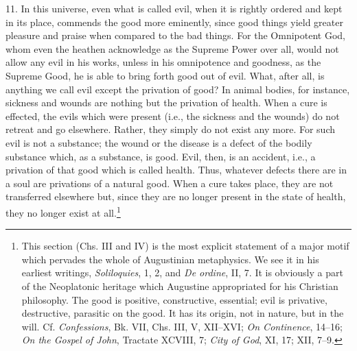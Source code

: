 11. In this universe, even what is called evil, when it is rightly ordered and kept in its place, commends the good more eminently, since good things yield greater pleasure and praise when compared to the bad things. For the Omnipotent God, whom even the heathen acknowledge as the Supreme Power over all, would not allow any evil in his works, unless in his omnipotence and goodness, as the Supreme Good, he is able to bring forth good out of evil. What, after all, is anything we call evil except the privation of good? In animal bodies, for instance, sickness and wounds are nothing but the privation of health. When a cure is effected, the evils which were present (i.e., the sickness and the wounds) do not retreat and go elsewhere. Rather, they simply do not exist any more. For such evil is not a substance; the wound or the disease is a defect of the bodily substance which, as a substance, is good. Evil, then, is an accident, i.e., a privation of that good which is called health. Thus, whatever defects there are in a soul are privations of a natural good. When a cure takes place, they are not transferred elsewhere but, since they are no longer present in the state of health, they no longer exist at all.\footnote{This section (Chs. III and IV) is the most explicit statement of a major motif which pervades the whole of Augustinian metaphysics. We see it in his earliest writings, \emph{Soliloquies}, 1, 2, and \emph{De ordine}, II, 7. It is obviously a part of the Neoplatonic heritage which Augustine appropriated for his Christian philosophy. The good is positive, constructive, essential; evil is privative, destructive, parasitic on the good. It has its origin, not in nature, but in the will. Cf. \emph{Confessions}, Bk. VII, Chs. III, V, XII–XVI; \emph{On Continence}, 14–16; \emph{On the Gospel of John}, Tractate XCVIII, 7; \emph{City of God}, XI, 17; XII, 7–9.}


